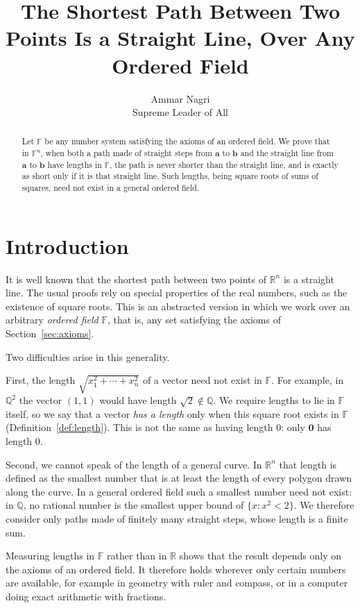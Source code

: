 \documentclass[11pt]{article}
\title{The Shortest Path Between Two Points Is a Straight Line, Over Any Ordered Field}
\author{Ammar Nagri\\ \small Supreme Leader of All}
\date{}
\theoremstyle{plain}
\theoremstyle{definition}
\theoremstyle{remark}
\begin{document}
\maketitle
\tableofcontents

\begin{abstract}
Let $\mathbb{F}$ be any number system satisfying the axioms of an ordered field. We prove that in $\mathbb{F}^n$, when both a path made of straight steps from $\mathbf{a}$ to $\mathbf{b}$ and the straight line from $\mathbf{a}$ to $\mathbf{b}$ have lengths in $\mathbb{F}$, the path is never shorter than the straight line, and is exactly as short only if it is that straight line. Such lengths, being square roots of sums of squares, need not exist in a general ordered field.
\end{abstract}

\section{Introduction}

It is well known that the shortest path between two points of $\mathbb{R}^n$ is a straight line. The usual proofs rely on special properties of the real numbers, such as the existence of square roots. This is an abstracted version in which we work over an arbitrary \emph{ordered field} $\mathbb{F}$, that is, any set satisfying the axioms of Section~\ref{sec:axioms}.

Two difficulties arise in this generality.

First, the length $\sqrt{x_1^2 + \cdots + x_n^2}$ of a vector need not exist in $\mathbb{F}$. For example, in $\mathbb{Q}^2$ the vector $(1,1)$ would have length $\sqrt{2} \notin \mathbb{Q}$. We require lengths to lie in $\mathbb{F}$ itself, so we say that a vector \emph{has a length} only when this square root exists in $\mathbb{F}$ (Definition~\ref{def:length}). This is not the same as having length $0$: only $\mathbf{0}$ has length $0$.

Second, we cannot speak of the length of a general curve. In $\mathbb{R}^n$ that length is defined as the smallest number that is at least the length of every polygon drawn along the curve. In a general ordered field such a smallest number need not exist: in $\mathbb{Q}$, no rational number is the smallest upper bound of $\{x : x^2 < 2\}$. We therefore consider only paths made of finitely many straight steps, whose length is a finite sum.

Measuring lengths in $\mathbb{F}$ rather than in $\mathbb{R}$ shows that the result depends only on the axioms of an ordered field. It therefore holds wherever only certain numbers are available, for example in geometry with ruler and compass, or in a computer doing exact arithmetic with fractions.
\end{document}
